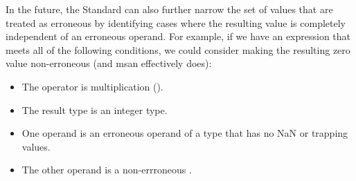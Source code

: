 In the future, the Standard can also further narrow the set of values that are treated as erroneous by identifying cases where the resulting value is completely independent of an erroneous operand.  For example, if we have an expression that meets all of the following conditions, we could consider making the resulting zero value non-erroneous (and msan effectively does):
\begin{itemize}
\item The operator is multiplication (\tcode{*}).
\item The result type is an integer type.
\item One operand is an erroneous operand of a type that has no NaN or trapping values.
\item The other operand is a non-errroneous .
\end{itemize}
